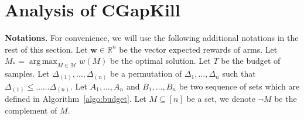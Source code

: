 \documentclass{article}
\newcommand{\junk}[1]{}
\newcommand{\AlgorithmBud}{{\small \textsf{CGapKill}}\xspace}
\newcommand{\Problem}{{\small \textsf{ExpCMAB}}\xspace}
\newcommand{\M}{\mathcal M}
\newcommand{\del}{\backslash}
\newcommand{\RR}{\mathbb R}
\DeclareMathOperator*{\argmax}{arg\,max}
\newcommand{\barlog}{\tilde{\log}}
\renewcommand{\vec}[1]{\boldsymbol{#1}}
\begin{document}

\section{Analysis of \AlgorithmBud}


\textbf{Notations.}
For convenience, we will use the following additional notations in the rest of this section.
Let $\vec w \in \RR^n$ be the vector expected rewards of arms.
Let $M_* = \argmax_{M\in \M} w(M)$ be the optimal solution.
Let $T$ be the budget of samples.
Let $\Delta_{(1)},\ldots,\Delta_{(n)}$ be a permutation of $\Delta_1,\ldots,\Delta_n$ such that
$\Delta_{(1)} \le \ldots \ldots \Delta_{(n)}$.
Let $A_1,\ldots,A_n$ and $B_1,\ldots, B_n$ be two sequence of sets which are defined in Algorithm~\ref{algo:budget}.
Let $M\subseteq [n]$ be a set, we denote $\neg M$ be the complement of $M$.


\junk{
\begin{lemma}
For each phase $t>0$ and each active arm $e\in [n] \del (A_t \cup B_t)$ of phase $t$, 
the arm $e$ must be pulled for at least $\tilde T_t$ times by Algorithm~X during phases $1,\ldots,t$, where $\tilde T$ is given by
\begin{equation}
\label{eq:define-tilde-t}
\tilde T_t = \left\lceil \frac{T-n}{\barlog(n)(n-t+1)} \right\rceil.
\end{equation}
\label{lemma:fbudget:samples}
\end{lemma}

\begin{proof}
Consider an arbitrary phase $t\in [n]$ and an arbitrary active arm $e\in [n] \del (A_t\cup B_t)$ of phase $t$.
Then, we can compute the number of pulls of arm $e$ as follows
\begin{equation}
\end{equation}
\end{proof}
}
\end{document}
